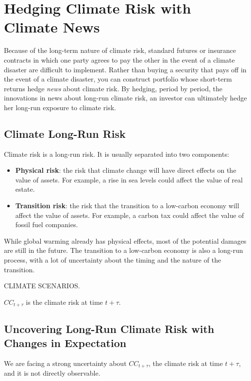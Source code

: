 \chapter{Hedging Climate Risk with Climate News}

Because of the long-term nature of climate risk,
standard futures or insurance 
contracts in which one party agrees 
to pay the other in the event of a climate 
disaster are difficult to implement. 
Rather than buying a security that pays off
in the event of a climate disaster, 
you can construct 
portfolio whose short-term returns hedge
\textit{news} about climate risk.
By hedging, period by period, the innovations 
in news about long-run climate risk, 
an investor can ultimately hedge her 
long-run exposure to climate risk.

\section{Climate Long-Run Risk}

Climate risk is a long-run risk.
It is usually separated into two components:
\begin{itemize}
    \item \textbf{Physical risk}: the risk that 
    climate change will have direct effects on 
    the value of assets. For example, 
    a rise in sea levels could affect the value 
    of real estate.
    \item \textbf{Transition risk}: the risk that 
    the transition to a low-carbon economy will 
    affect the value of assets. For example, 
    a carbon tax could affect the value of 
    fossil fuel companies.
\end{itemize}

While global warming already has physical effects,
most of the potential damages are still in the future.
The transition to a low-carbon economy is also
a long-run process, with a lot of uncertainty
about the timing and the nature of the transition.

CLIMATE SCENARIOS.

$CC_{t+\tau}$ is the climate risk at time $t+\tau$.

\section{Uncovering Long-Run Climate Risk
with Changes in Expectation}

We are facing a strong uncertainty about 
$CC_{t+\tau}$, the climate risk at time $t+\tau$,
and it is not directly observable.

